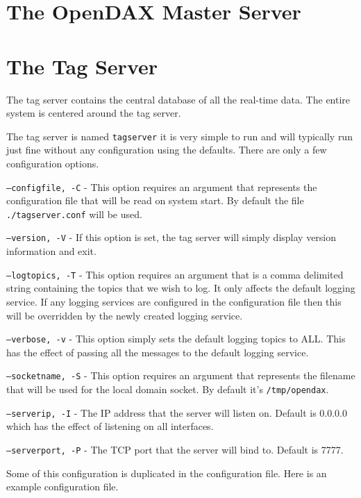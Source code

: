 	\chapter{The OpenDAX Master Server}
	
	
	\chapter{The Tag Server}
	The tag server contains the central database of all the real-time data.  The
	entire system is centered around the tag server.
	
	The tag server is named \texttt{tagserver} it is very simple to run and will
	typically run just fine without any configuration using the defaults.  There are
	only a few configuration options.
	
	\begin{list}{}{Command Line Options}
		\item[\texttt{--configfile, -C}] - This option requires an argument that
		represents the configuration file that will be read on system start.  By default
		the file \texttt{./tagserver.conf} will be used.
		\item[\texttt{--version, -V}] - If this option is set, the tag server will
		simply display version information and exit.
		\item[\texttt{--logtopics, -T}] - This option requires an argument that is a
		comma delimited string containing the topics that we wish to log.  It only
		affects the default logging service.  If any logging services are configured in
		the configuration file then this will be overridden by the newly created logging
		service.
		\item[\texttt{--verbose, -v}] - This option simply sets the default logging
		topics to ALL.  This has the effect of passing all the messages to the default
		logging service.
		\item[\texttt{--socketname, -S}] - This option requires an argument that
		represents the filename that will be used for the local domain socket.  By
		default it's \texttt{/tmp/opendax}.
		\item[\texttt{--serverip, -I}] - The IP address that the server will listen on.
		Default is 0.0.0.0 which has the effect of listening on all interfaces.
		\item[\texttt{--serverport, -P}] - The TCP port that the server will bind to. 
		Default is 7777.
	\end{list}
	
	Some of this configuration is duplicated in the configuration file.  Here is an
	example configuration file.
	
